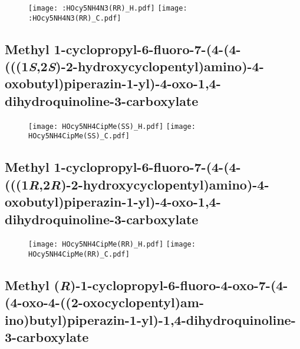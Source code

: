 \begin{figure}[H]
	\centering
		\texttt{[image: :HOcy5NH4N3(RR)\_H.pdf]}
		\texttt{[image: :HOcy5NH4N3(RR)\_C.pdf]}
\end{figure}

\subsection{Methyl 1\hyp{}cyclopropyl\hyp{}6\hyp{}fluoro\hyp{}7\hyp{}(4\hyp{}(4\hyp{}(((1\textit{S},2\textit{S})\hyp{}2\hyp{}hydroxycyclopentyl)amino)\hyp{}4\hyp{}oxobutyl)piperazin\hyp{}1\hyp{}yl)\hyp{}4\hyp{}oxo\hyp{}1,4\hyp{}dihydroquinoline\hyp{}3\hyp{}carboxylate }

\begin{figure}[H]
	\centering
		\texttt{[image: HOcy5NH4CipMe(SS)\_H.pdf]}
		\texttt{[image: HOcy5NH4CipMe(SS)\_C.pdf]}
\end{figure}

\subsection{Methyl 1\hyp{}cyclopropyl\hyp{}6\hyp{}fluoro\hyp{}7\hyp{}(4\hyp{}(4\hyp{}(((1\textit{R},2\textit{R})\hyp{}2\hyp{}hydroxycyclopentyl)amino)\hyp{}4\hyp{}oxobutyl)piperazin\hyp{}1\hyp{}yl)\hyp{}4\hyp{}oxo\hyp{}1,4\hyp{}dihydroquinoline\hyp{}3\hyp{}carboxylate }

\begin{figure}[H]
	\centering
		\texttt{[image: HOcy5NH4CipMe(RR)\_H.pdf]}
		\texttt{[image: HOcy5NH4CipMe(RR)\_C.pdf]}
\end{figure}

\subsection{Methyl (\textit{R})\hyp{}1\hyp{}cyclopropyl\hyp{}6\hyp{}fluoro\hyp{}4\hyp{}oxo\hyp{}7\hyp{}(4\hyp{}(4\hyp{}oxo\hyp{}4\hyp{}((2\hyp{}oxocyclopentyl)am\hyp{}ino)butyl)piperazin\hyp{}1\hyp{}yl)\hyp{}1,4\hyp{}dihydroquinoline\hyp{}3\hyp{}carboxylate }

